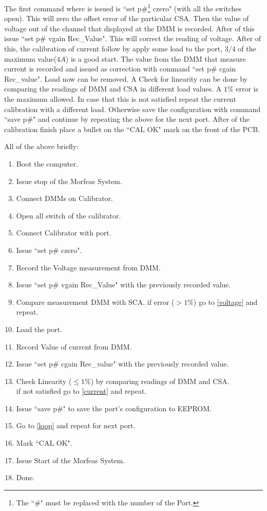 The first command where is issued is ``set p\#\footnote{The ``\#" must be replaced with the number of the Port.} czero" (with all the switches open).
This will zero the offset error of the particular CSA.
Then the value of voltage out of the channel that displayed at the DMM is recorded.
After of this issue ``set p\# vgain Rec\_Value".
This will correct the reading of voltage.
After of this, the calibration of current follow by apply some load to the port, $3/4$ of the maximum value($4A$) is a good start.
The value from the DMM that measure current is recorded and issued as correction with command ``set p\# cgain Rec\_value".
Load now can be removed. A Check for linearity can be done by comparing the readings of DMM and CSA in different load values.
A $1\%$ error is the maximum allowed.
In case that this is not satisfied repeat the current calibration with a different load.
Otherwise save the configuration with command ``save p\#" and continue by repeating the above for the next port.
After of the calibration finish place a bullet on the ``CAL OK" mark on the front of the PCB.\\
\par\noindent
All of the above briefly:
\begin{enumerate}
	\item Boot the computer.
	\item Issue stop of the Morfeas System.
	\item Connect DMMs on Calibrator.
	\item Open all switch of the calibrator. \label{loop}
	\item Connect Calibrator with port.
	\item Issue ``set p\# czero".
	\item Record the Voltage measurement from DMM.\label{voltage}
	\item Issue ``set p\# vgain Rec\_Value" with the previously recorded value.
	\item Compare measurement DMM with SCA. if error ($>1\%$) go to \ref{voltage} and repeat.
	\item Load the port.\label{current}
	\item Record Value of current from DMM.
	\item Issue ``set p\# cgain Rec\_value" with the previously recorded value.
	\item Check Linearity ($\leq1\%$) by comparing readings of DMM and CSA.\\ if not satisfied go to \ref{current} and repeat.
	\item Issue ``save p\#" to save the port's configuration to EEPROM.
	\item Go to \ref{loop} and repeat for next port.
	\item Mark ``CAL OK".
	\item Issue Start of the Morfeas System.
	\item Done.
\end{enumerate}
